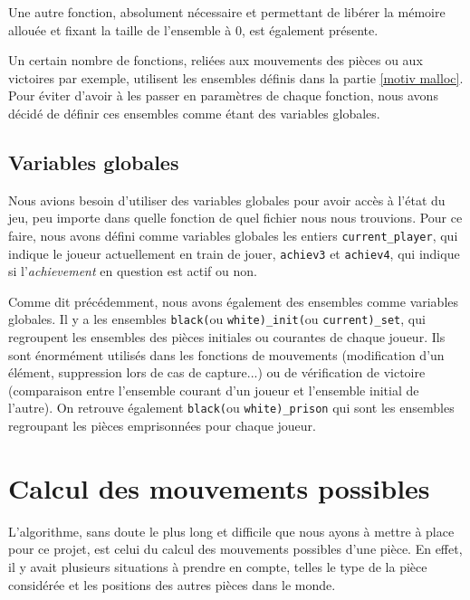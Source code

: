 \documentclass[a4paper]{article}
\begin{document}
Une autre fonction, absolument nécessaire et permettant de libérer la mémoire allouée et fixant la taille de l'ensemble à 0, est également présente.

\vspace{0.5cm}

Un certain nombre de fonctions, reliées aux mouvements des pièces ou aux victoires par exemple, utilisent les ensembles définis dans la partie \ref{motiv malloc}. Pour éviter d'avoir à les passer en paramètres de chaque fonction, nous avons décidé de définir ces ensembles comme étant des variables globales.

\subsection{Variables globales}
\label{var glob}

Nous avions besoin d'utiliser des variables globales pour avoir accès à l'état du jeu, peu importe dans quelle fonction de quel fichier nous nous trouvions. Pour ce faire, nous avons défini comme variables globales les entiers \verb|current_player|, qui indique le joueur actuellement en train de jouer, \verb|achiev3| et \verb|achiev4|, qui indique si l'\emph{achievement} en question est actif ou non.

Comme dit précédemment, nous avons également des ensembles comme variables globales. Il y a les ensembles \verb|black(|ou \verb|white)_init(|ou \verb|current)_set|, qui regroupent les ensembles des pièces initiales ou courantes de chaque joueur. Ils sont énormément utilisés dans les fonctions de mouvements (modification d'un élément, suppression lors de cas de capture...) ou de vérification de victoire (comparaison entre l'ensemble courant d'un joueur et l'ensemble initial de l'autre). On retrouve également \verb|black(|ou \verb|white)_prison| qui sont les ensembles regroupant les pièces emprisonnées pour chaque joueur.


\section{Calcul des mouvements possibles}
\label{mvts}
L'algorithme, sans doute le plus long et difficile que nous ayons à mettre à place pour ce projet, est celui du calcul des mouvements possibles d'une pièce. En effet, il y avait plusieurs situations à prendre en compte, telles le type de la pièce considérée et les positions des autres pièces dans le monde.
\end{document}

